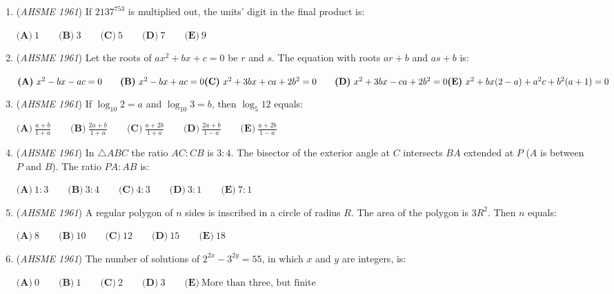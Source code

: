 \begin{enumerate}
 $\textbf{(A)}\ \infty\qquad \textbf{(B)}\ \text{finite, but greater than 2}\qquad \textbf{(C)}\ 2\qquad \textbf{(D)}\ 1\qquad \textbf{(E)}\ 0$


	\item (\textit{AHSME 1961}) If $2137^{753}$ is multiplied out, the units' digit in the final product is:


 $\textbf{(A)}\ 1\qquad \textbf{(B)}\ 3\qquad \textbf{(C)}\ 5\qquad \textbf{(D)}\ 7\qquad \textbf{(E)}\ 9$


	\item (\textit{AHSME 1961}) Let the roots of $ax^2+bx+c=0$ be $r$ and $s$. The equation with roots $ar+b$ and $as+b$ is:


 $\textbf{(A)}\ x^2-bx-ac=0\qquad \textbf{(B)}\ x^2-bx+ac=0 \qquad\\ \textbf{(C)}\ x^2+3bx+ca+2b^2=0 \qquad \textbf{(D)}\ x^2+3bx-ca+2b^2=0 \qquad\\ \textbf{(E)}\ x^2+bx(2-a)+a^2c+b^2(a+1)=0$


	\item (\textit{AHSME 1961}) If $\log_{10}2=a$ and $\log_{10}3=b$, then $\log_{5}12$ equals:


 $\textbf{(A)}\ \frac{a+b}{1+a}\qquad \textbf{(B)}\ \frac{2a+b}{1+a}\qquad \textbf{(C)}\ \frac{a+2b}{1+a}\qquad \textbf{(D)}\ \frac{2a+b}{1-a}\qquad \textbf{(E)}\ \frac{a+2b}{1-a}$


	\item (\textit{AHSME 1961}) In $\triangle ABC$ the ratio $AC:CB$ is $3:4$. The bisector of the exterior angle at $C$ intersects $BA$ extended at $P$ 
($A$ is between $P$ and $B$). The ratio $PA:AB$ is:


 $\textbf{(A)}\ 1:3 \qquad \textbf{(B)}\ 3:4 \qquad \textbf{(C)}\ 4:3 \qquad \textbf{(D)}\ 3:1 \qquad \textbf{(E)}\ 7:1$


	\item (\textit{AHSME 1961}) A regular polygon of $n$ sides is inscribed in a circle of radius $R$. The area of the polygon is $3R^2$. Then $n$ equals: 


 $\textbf{(A)}\ 8\qquad \textbf{(B)}\ 10\qquad \textbf{(C)}\ 12\qquad \textbf{(D)}\ 15\qquad \textbf{(E)}\ 18$


	\item (\textit{AHSME 1961}) The number of solutions of $2^{2x}-3^{2y}=55$, in which $x$ and $y$ are integers, is:


 $\textbf{(A)}\ 0\qquad \textbf{(B)}\ 1\qquad \textbf{(C)}\ 2\qquad \textbf{(D)}\ 3\qquad \textbf{(E)}\ \text{More than three, but finite}$



\end{enumerate}
